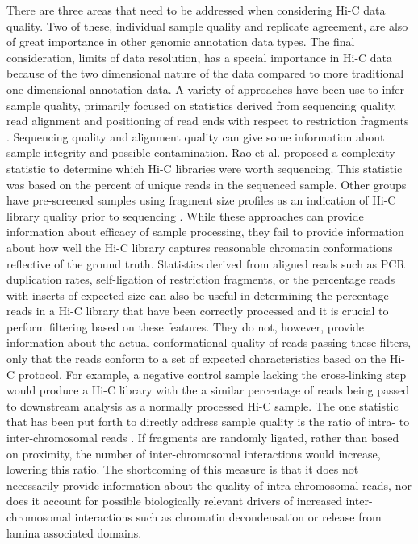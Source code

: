 There are three areas that need to be addressed when considering Hi-C data quality. Two of these, individual sample quality and replicate agreement, are also of great importance in other genomic annotation data types. The final consideration, limits of data resolution, has a special importance in Hi-C data because of the two dimensional nature of the data compared to more traditional one dimensional annotation data. A variety of approaches have been use to infer sample quality, primarily focused on statistics derived from sequencing quality, read alignment and positioning of read ends with respect to restriction fragments \cite{sexton_three-dimensional_2012,dixon_topological_2012,le_dily_distinct_2014,rao_3d_2014,stevens_3d_2017,phanstiel_static_2017,nora_targeted_2017}. Sequencing quality and alignment quality can give some information about sample integrity and possible contamination. Rao et al. \cite{rao_3d_2014} proposed a complexity statistic to determine which Hi-C libraries were worth sequencing. This statistic was based on the percent of unique reads in the sequenced sample. Other groups have pre-screened samples using fragment size profiles as an indication of Hi-C library quality prior to sequencing \cite{stevens_3d_2017,phanstiel_static_2017}. While these approaches can provide information about efficacy of sample processing, they fail to provide information about how well the Hi-C library captures reasonable chromatin conformations reflective of the ground truth. Statistics derived from aligned reads such as PCR duplication rates, self-ligation of restriction fragments, or the percentage reads with inserts of expected size can also be useful in determining the percentage reads in a Hi-C library that have been correctly processed and it is crucial to perform filtering based on these features. They do not, however, provide information about the actual conformational quality of reads passing these filters, only that the reads conform to a set of expected characteristics based on the Hi-C protocol. For example, a negative control sample lacking the cross-linking step would produce a Hi-C library with the a similar percentage of reads being passed to downstream analysis as a normally processed Hi-C sample. The one statistic that has been put forth to directly address sample quality is the ratio of intra- to inter-chromosomal reads \cite{nagano_comparison_2015}. If fragments are randomly ligated, rather than based on proximity, the number of inter-chromosomal interactions would increase, lowering this ratio. The shortcoming of this measure is that it does not necessarily provide information about the quality of intra-chromosomal reads, nor does it account for possible biologically relevant drivers of increased inter-chromosomal interactions such as chromatin decondensation or release from lamina associated domains.
